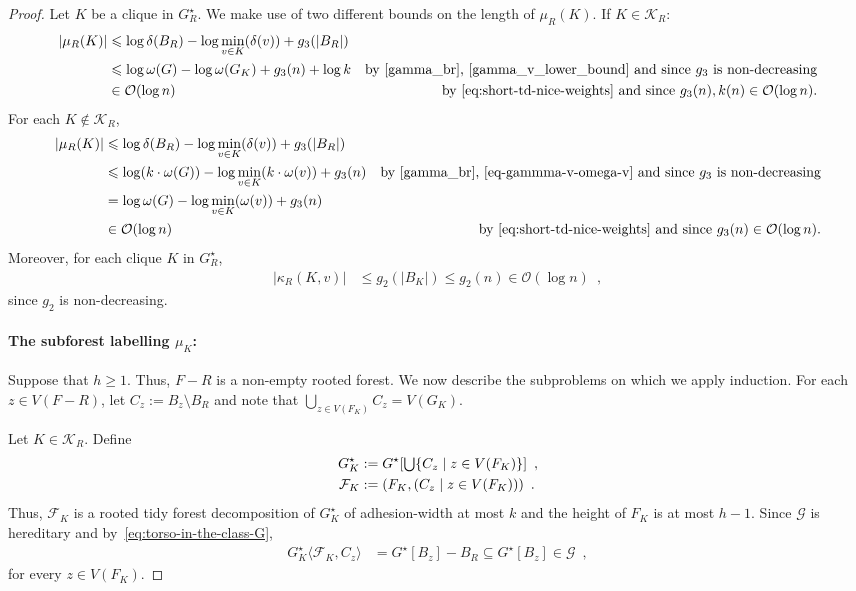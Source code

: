 \documentclass{patmorin}
\let\eqref\cref
\renewcommand{\le}{\leqslant}
\renewcommand{\geq}{\geqslant}
\renewcommand{\leq}{\leqslant}
\newcommand{\torso}[2]{{#1}\langle{#2}\rangle}
\newcommand{\Oh}{\mathcal{O}}
\DeclarePairedDelimiter{\set}{\{}{\}}
\begin{document}
\begin{proof}
    Let $K$ be a clique in $G^\star_R$. We make use of two different bounds on the length of $\mu_R(K)$.  If $K\in\mathcal{K}_R$:
    \begin{align}
       |\mu_R(K)|
       & \le\log \delta(B_R) - \log \min_{v\in K}(\delta(v)) + g_3(|B_R|) \notag \\
       & \le\log \omega(G) - \log \omega(G_K) + g_3(n) + \log k
       & \textrm{by~\eqref{gamma_br},~\eqref{gamma_v_lower_bound} and since $g_3$ is non-decreasing} \label{mu_RK_i}\\
       &\in\Oh(\log n)&\textrm{by~\eqref{eq:short-td-nice-weights} and since $g_3(n), k(n)\in\Oh(\log n).$}
    \end{align}
    For each $K\not\in\mathcal{K}_R$, 
    \begin{align}
       |\mu_R(K)|
       & \le\log \delta(B_R) - \log\min_{v\in K}(\delta(v)) + g_3(|B_R|) \notag \\
       & \le\log(k\cdot\omega(G)) - \log\min_{v\in K}(k\cdot\omega(v)) + g_3(n)
       & \text{by \eqref{gamma_br},~\eqref{eq-gammma-v-omega-v} and since $g_3$ is non-decreasing}\notag\\
       & = \log \omega(G) - \log\min_{v\in K}(\omega(v)) + g_3(n)
       \label{mu_RK_ii}\\
       &\in\Oh(\log n)&\textrm{by~\eqref{eq:short-td-nice-weights} and since $g_3(n)\in\Oh(\log n)$.}
       \label{eq:mu_R(K)-in-logn}
    \end{align}
    Moreover, for each clique $K$ in $G^\star_R$,
    \begin{align}
      |\kappa_R(K,v)|
      & \leq g_2(|B_K|) \leq g_2(n) \in \Oh(\log n) \enspace ,
      \label{eq:kappa_R-logn}
    \end{align}
    since $g_2$ is non-decreasing.%

    \paragraph{\boldmath The subforest labelling $\mu_K$:}
    Suppose that $h\geq1$. Thus, $F-R$ is a non-empty rooted forest. We now describe the subproblems on which we apply induction. For each $z\in V(F-R)$, let $C_z:=B_z\setminus B_R$ and
    note that $\bigcup_{z\in V(F_K)}C_z=V(G_K)$.

    Let $K\in\mathcal{K}_R$. Define
    \begin{align*}
        G^\star_K&:=G^\star[\textstyle\bigcup\set{C_z\mid z\in V(F_K)}]\enspace,\\
        \mathcal{F}_K&:=(F_K, (C_z \mid z\in V(F_K)))\enspace.
    \end{align*}
    Thus, $\mathcal{F}_K$ is a rooted tidy forest decomposition of $G^\star_K$ of adhesion-width at most $k$ and the height of $F_K$ is at most $h-1$.
    Since $\mathcal{G}$ is hereditary and by~\eqref{eq:torso-in-the-class-G},
    \begin{align*}
        \torso{G^\star_K}{\mathcal{F}_K,C_z}&=G^\star[B_z]-B_R\subseteq G^\star[B_z]\in \mathcal{G}\enspace ,
    \end{align*}
    for every $z \in V(F_K)$.


\end{proof}
\end{document}
